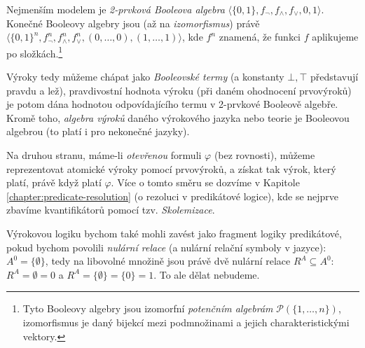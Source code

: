Nejmenším modelem je \emph{2-prvková Booleova algebra} $\langle \{0,1\},f_\neg,f_\land,f_\lor,0,1\rangle$. Konečné Booleovy algebry jsou (až na \emph{izomorfismus}) právě $\langle \{0,1\}^n,f_\neg^n,f_\land^n,f_\lor^n,(0,\dots,0),(1,\dots,1)\rangle$, kde $f^n$ znamená, že funkci $f$ aplikujeme po složkách.\footnote{Tyto Booleovy algebry jsou izomorfní \emph{potenčním algebrám} $\mathcal P(\{1,\dots,n\})$, izomorfismus je daný bijekcí mezi podmnožinami a jejich charakteristickými vektory.}

Výroky tedy můžeme chápat jako \emph{Booleovské termy} (a konstanty $\bot,\top$ představují pravdu a lež), pravdivostní hodnota výroku (při daném ohodnocení prvovýroků) je potom dána hodnotou odpovídajícího termu v 2-prvkové Booleově algebře. Kromě toho, \emph{algebra výroků} daného výrokového jazyka nebo teorie je Booleovou algebrou (to platí i pro nekonečné jazyky).

Na druhou stranu, máme-li \emph{otevřenou} formuli $\varphi$ (bez rovnosti), můžeme reprezentovat atomické výroky pomocí prvovýroků, a získat tak výrok, který platí, právě když platí $\varphi$. Více o tomto směru se dozvíme v Kapitole \ref{chapter:predicate-resolution} (o rezoluci v predikátové logice), kde se nejprve zbavíme kvantifikátorů pomocí tzv. \emph{Skolemizace}.

Výrokovou logiku bychom také mohli zavést jako fragment logiky predikátové, pokud bychom povolili \emph{nulární relace} (a nulární relační symboly v jazyce): $A^0=\{\emptyset\}$, tedy na libovolné množině jsou právě dvě nulární relace $R^A\subseteq A^0$: $R^A=\emptyset=0$ a $R^A=\{\emptyset\}=\{0\}=1$. To ale dělat nebudeme. 
 

